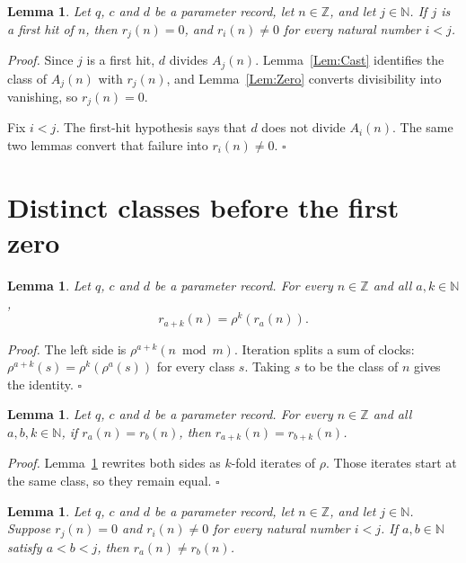 \documentclass[11pt,letterpaper]{article}
\newcommand{\N}{\mathbb{N}}
\newcommand{\Z}{\mathbb{Z}}
\newtheorem{lemma}[theorem]{Lemma}
\newenvironment{proof}{\noindent\textit{Proof.}}{\hfill\(\square\)}
\begin{document}
\begin{lemma}
\label{Lem:HitResidue}
Let \(q\), \(c\) and \(d\) be a parameter record, let \(n\in\Z\), and let \(j\in\N\). If \(j\) is a first hit of \(n\), then \(r_{j}(n)=0\), and \(r_{i}(n)\neq 0\) for every natural number \(i<j\).
\end{lemma}

\begin{proof}
Since \(j\) is a first hit, \(d\) divides \(A_{j}(n)\). Lemma~\ref{Lem:Cast} identifies the class of \(A_{j}(n)\) with \(r_{j}(n)\), and Lemma~\ref{Lem:Zero} converts divisibility into vanishing, so \(r_{j}(n)=0\).

Fix \(i<j\). The first-hit hypothesis says that \(d\) does not divide \(A_{i}(n)\). The same two lemmas convert that failure into \(r_{i}(n)\neq 0\).
\end{proof}

\section{Distinct classes before the first zero}

\begin{lemma}
\label{Lem:Add}
Let \(q\), \(c\) and \(d\) be a parameter record. For every \(n\in\Z\) and all \(a,k\in\N\),
\[
r_{a+k}(n)=\rho^{k}(r_{a}(n)).
\]
\end{lemma}

\begin{proof}
The left side is \(\rho^{a+k}(n\bmod m)\). Iteration splits a sum of clocks: \(\rho^{a+k}(s)=\rho^{k}(\rho^{a}(s))\) for every class \(s\). Taking \(s\) to be the class of \(n\) gives the identity.
\end{proof}

\begin{lemma}
\label{Lem:Agree}
Let \(q\), \(c\) and \(d\) be a parameter record. For every \(n\in\Z\) and all \(a,b,k\in\N\), if \(r_{a}(n)=r_{b}(n)\), then \(r_{a+k}(n)=r_{b+k}(n)\).
\end{lemma}

\begin{proof}
Lemma~\ref{Lem:Add} rewrites both sides as \(k\)-fold iterates of \(\rho\). Those iterates start at the same class, so they remain equal.
\end{proof}

\begin{lemma}
\label{Lem:Distinct}
Let \(q\), \(c\) and \(d\) be a parameter record, let \(n\in\Z\), and let \(j\in\N\). Suppose \(r_{j}(n)=0\) and \(r_{i}(n)\neq 0\) for every natural number \(i<j\). If \(a,b\in\N\) satisfy \(a<b<j\), then \(r_{a}(n)\neq r_{b}(n)\).
\end{lemma}
\end{document}
